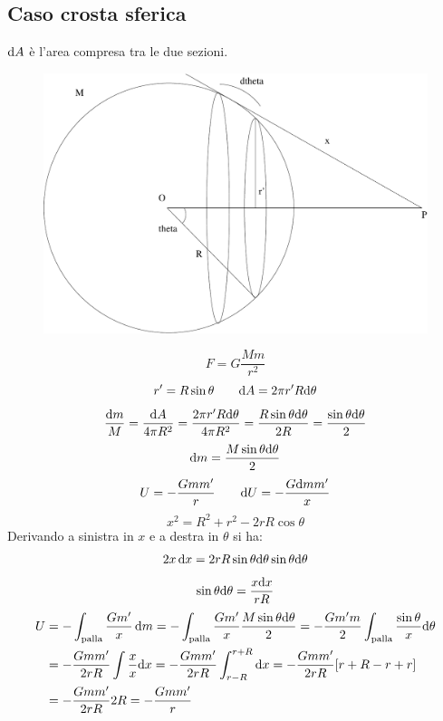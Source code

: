 \subsection{Caso crosta sferica}
$\mathrm{d} A$ è l'area compresa tra le due sezioni.
\begin{figure}[htbp]
   \centering
   \includegraphics[scale=0.3]{immagini/fisica1/crosta}
\end{figure}
\begin{equation*}F=G\frac{Mm}{r^2}\end{equation*}
\begin{equation*}r'=R\sin\theta\qquad \mathrm{d} A=2\pi r'R\mathrm{d}\theta\end{equation*}
$$\frac{\mathrm{d} m}{M}=\frac{\mathrm{d}
A}{4\pi R^2}=\frac{2\pi r'R\mathrm{d}\theta}{4\pi
R^2}=\frac{R\sin\theta\mathrm{d}\theta}{2R}=\frac{\sin\theta\mathrm{d}\theta}{2}$$
\begin{equation*}\mathrm{d} m=\frac{M\sin\theta\mathrm{d}\theta}{2}\end{equation*}
\begin{equation*}U=-\frac{Gmm'}{r}\qquad\mathrm{d} U=-\frac{G\mathrm{d} m m'}{x}\end{equation*}
\begin{equation*}x^2=R^2+r^2-2rR\cos\theta\end{equation*}
Derivando a sinistra in $x$ e a destra in $\theta$ si ha:
\begin{equation*}2x\,\mathrm{d} x=2rR\sin\theta\mathrm{d}\theta\sin\theta\mathrm{d}\theta\end{equation*}
\begin{equation*}\sin\theta\mathrm{d}\theta=\frac{x\mathrm{d} x}{rR}\end{equation*}
\begin{align*}
U&=-\int_{\text{palla}}\frac{Gm'}{x}\,\mathrm{d}
m=-\int_{\text{palla}}\frac{Gm'}{x}\frac{M\sin\theta\mathrm{d}\theta}{2}=-\frac{Gm'
m}{2}\int_{\text{palla}}\frac{\sin\theta}{x}\mathrm{d}\theta\\
&=-\frac{Gmm'}{2rR}\int\frac{x}{x}\mathrm{d}
x=-\frac{Gmm'}{2rR}\int_{r-R}^{r+R}\mathrm{d}
x=-\frac{Gmm'}{2rR}[r+R-r+r]\\
&=-\frac{Gmm'}{2rR}2R=-\frac{Gmm'}{r}
\end{align*}
